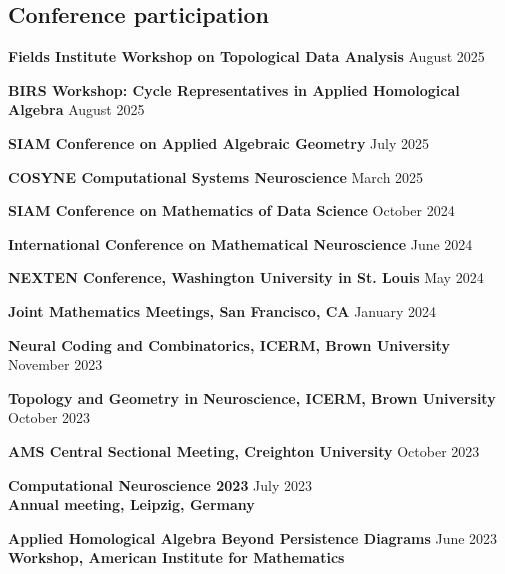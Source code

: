 \documentclass[10pt,letterpaper]{article}
\renewenvironment{itemize}{
  \begin{list}{}{
    \setlength{\leftmargin}{1.5em}
    \setlength{\itemsep}{0.25em}
    \setlength{\parskip}{0pt}
    \setlength{\parsep}{0.25em}
  }
}{
  \end{list}
}
\begin{document}
\subsection*{Conference participation}
\begin{itemize}

	\item{\bf Fields Institute Workshop on Topological Data Analysis} \hfill August 2025

	\item{\bf BIRS Workshop: Cycle Representatives in Applied Homological Algebra} \hfill August 2025

	\item{\bf SIAM Conference on Applied Algebraic Geometry} \hfill July 2025
	
	\item{\bf COSYNE Computational Systems Neuroscience} \hfill March 2025

	\item{\bf SIAM Conference on Mathematics of Data Science} \hfill October 2024

	\item{\bf International Conference on Mathematical Neuroscience} \hfill June 2024
	
	\item{\bf NEXTEN Conference, Washington University in St. Louis} \hfill May 2024

	{\item {\bf Joint Mathematics Meetings, San Francisco, CA} \hfill January 2024}
	
	{\item {\bf Neural Coding and Combinatorics, ICERM, Brown University} \hfill November 2023}
	
	{\item {\bf Topology and Geometry in Neuroscience, ICERM, Brown University} \hfill October 2023}
	
	{\item {\bf AMS Central Sectional Meeting, Creighton University} \hfill October 2023}

	\item {\bf Computational Neuroscience 2023} \hfill July 2023\\
	{\bf Annual meeting, Leipzig, Germany}


	\item {\bf Applied Homological Algebra Beyond Persistence Diagrams} \hfill June 2023\\
	{\bf Workshop, American Institute for Mathematics}
	

\end{itemize}
\end{document}
